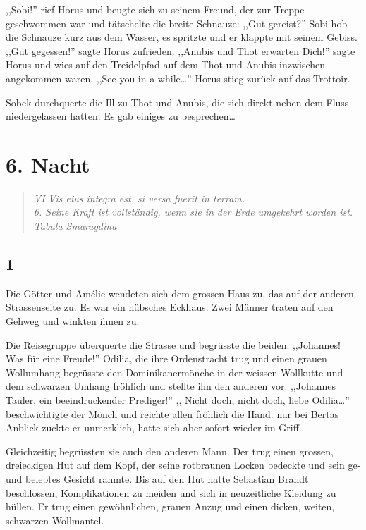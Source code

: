 \documentclass[11pt,titlepage,a5paper]{book}
\begin{document}
,,Sobi!'' rief Horus und beugte sich zu seinem Freund, der zur Treppe geschwommen war und tätschelte die breite Schnauze: ,,Gut gereist?'' Sobi hob die Schnauze kurz aus dem Wasser, es spritzte und er klappte mit seinem Gebiss. ,,Gut gegessen!'' sagte Horus zufrieden. ,,Anubis und Thot erwarten Dich!'' sagte Horus und wies auf den Treidelpfad auf dem Thot und Anubis inzwischen angekommen waren. ,,See you in a while\dots '' Horus stieg zurück auf das Trottoir.

Sobek durchquerte die Ill zu Thot und Anubis, die sich direkt neben dem Fluss niedergelassen hatten. Es gab einiges zu besprechen\dots

\chapter*{6. Nacht}

\begin{quotation}

\emph{VI Vis eius integra est, si versa fuerit in terram.\\6. Seine Kraft ist vollständig, wenn sie in der Erde umgekehrt worden ist.  \\Tabula Smaragdina}

\end{quotation}

\section*{1}

Die Götter und Amélie wendeten sich dem grossen Haus zu, das auf der anderen Strassenseite zu. Es war ein hübsches Eckhaus. Zwei Männer traten auf den Gehweg und winkten ihnen zu.

Die Reisegruppe überquerte die Strasse und begrüsste die beiden. ,,Johannes! Was für eine Freude!'' Odilia, die ihre Ordenstracht trug und einen grauen Wollumhang begrüsste den Dominikanermönche in der weissen Wollkutte und dem schwarzen Umhang fröhlich und stellte ihn den anderen vor. ,,Johannes Tauler, ein beeindruckender Prediger!'' ,, Nicht doch, nicht doch, liebe Odilia\dots '' beschwichtigte der Mönch und reichte allen fröhlich die Hand. nur bei Bertas Anblick zuckte er unmerklich, hatte sich aber sofort wieder im Griff.

Gleichzeitig begrüssten sie auch den anderen Mann. Der trug einen grossen, dreieckigen Hut auf dem Kopf, der seine rotbraunen Locken bedeckte und sein ge- und belebtes Gesicht rahmte. Bis auf den Hut hatte Sebastian Brandt beschlossen, Komplikationen zu meiden und sich in neuzeitliche Kleidung zu hüllen. Er trug einen gewöhnlichen, grauen Anzug und einen dicken, weiten, schwarzen Wollmantel. 
\end{document}
